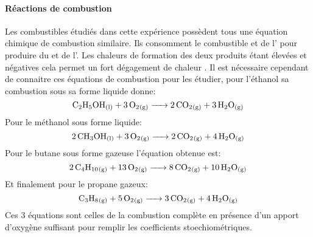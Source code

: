 \paragraph*{Réactions de combustion}
Les combustibles étudiés dans cette expérience possèdent tous une équation chimique de combustion similaire. Ils consomment le combustible et de l' pour produire du  et de l'. Les chaleurs de formation des deux produits étant élevées et négatives cela permet un fort dégagement de chaleur \cite{notice}. Il est nécessaire cependant de connaitre ces équations de combustion pour les étudier, pour l'éthanol  sa combustion sous sa forme liquide donne:
\begin{equation}
    \ce{ C_2H_5OH_{(l)} + 3O_2_{(g)} -> 2CO_2_{(g)} + 3H_2O_{(g)} }
    \label{eq:ethanol_combustion}
\end{equation}
Pour le méthanol  sous forme liquide:
\begin{equation}
    \ce{ 2CH3OH_{(l)} + 3O_2_{(g)} -> 2CO_2_{(g)} + 4H_2O_{(g)} }
    \label{eq:methanol_combustion}
\end{equation}
Pour le butane  sous forme gazeuse l'équation obtenue est:
\begin{equation}
    \ce{ 2C_4H_{10}_{(g)} + 13O_2_{(g)} -> 8CO_2_{(g)} + 10H_2O_{(g)} }
    \label{eq:butane_combustion}
\end{equation}
Et finalement pour le propane  gazeux:
\begin{equation}
    \ce{ C_3H_8_{(g)} + 5O_2_{(g)} -> 3CO_2_{(g)} + 4H_2O_{(g)} }
    \label{eq:propane_combustion}
\end{equation}
Ces 3 équations sont celles de la combustion complète en présence d'un apport d'oxygène suffisant pour remplir les coefficients stoechiométriques.

